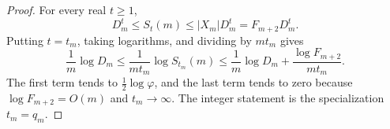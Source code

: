 \begin{proof}
For every real \(t\ge1\),
\[
 D_m^t\le S_t(m)\le |X_m|D_m^t=F_{m+2}D_m^t.
\]
Putting \(t=t_m\), taking logarithms, and dividing by \(mt_m\) gives
\[
 \frac1m\log D_m
 \le \frac{1}{mt_m}\log S_{t_m}(m)
 \le \frac1m\log D_m+\frac{\log F_{m+2}}{mt_m}.
\]
The first term tends to \(\frac12\log\varphi\), and the last term tends to
zero because \(\log F_{m+2}=O(m)\) and \(t_m\to\infty\).  The integer
statement is the specialization \(t_m=q_m\).
\end{proof}
